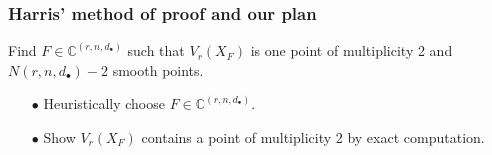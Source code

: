 \documentclass{beamer}
\theoremstyle{definition}
\begin{document}
\begin{frame}
\frametitle{Harris' method of proof and our plan}




\begin{minipage}{.65\textwidth}
Find $F\in\mathbb{C}^{(r,n,d_\bullet)}$ such that $V_r(X_F)$ is one point of multiplicity 2 and $N(r,n,d_\bullet)-2$ smooth points.
\begin{enumerate}
\item[$\bullet$] Heuristically choose $F\in\mathbb{C}^{(r,n,d_\bullet)}$.

\item[$\bullet$] Show $V_r(X_F)$ contains a point of multiplicity 2 by exact computation.


\end{enumerate}
\end{minipage}
\end{frame}
\end{document}

